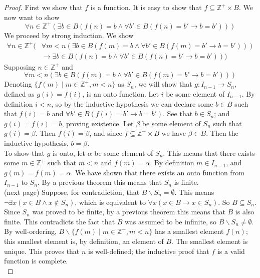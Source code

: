 \documentclass{report}
\theoremstyle{definition}
\begin{document}
\begin{proof}
First we show that $f$ is a function. It is easy to show that $f\subseteq\mathbb Z^+\times B$.
We now want to show
\begin{equation*}
\forall n\in\mathbb Z^+(\exists b\in B(f(n)=b\land\forall b'\in B(f(n)=b'\to b=b')))
\end{equation*}
We proceed by strong induction. We show
\begin{align*}
\forall n\in\mathbb Z^+(&\forall m<n(\exists b\in B(f(m)=b\land\forall b'\in B(f(m)=b'\to b=b')))\\
&\to\exists b\in B(f(n)=b\land\forall b'\in B(f(n)=b'\to b=b')))
\end{align*}
Supposing $n\in\mathbb Z^+$ and
\begin{equation*}
\forall m<n(\exists b\in B(f(m)=b\land\forall b'\in B(f(m)=b'\to b=b')))
\end{equation*}
Denoting $\{f(m)\mid m\in\mathbb Z^+,m<n\}$ as $S_n$,
we will show that $g:I_{n-1}\to S_n$, defined as $g(i)=f(i)$, is an onto function. Let $i$ be some element of $I_{n-1}$. 
By definition $i<n$, so by the inductive hypothesis we can declare some $b\in B$ such that $f(i)=b$ and $\forall b'\in B(f(i)=b'\to b=b')$. 
See that $b\in S_n$; and $g(i)=f(i)=b$, proving existence. Let $\beta$ be some element of $S_n$ such that $g(i)=\beta$. Then $f(i)=\beta$, and since $f\subseteq\mathbb Z^+\times B$ we have
$\beta\in B$. Then the inductive hypothesis, $b=\beta$.\\
\indent To show that $g$ is onto, let $\alpha$ be some element of $S_n$. This means that there exists some $m\in\mathbb Z^+$ such that $m<n$ and $f(m)=\alpha$. By definition $m\in I_{n-1}$, and 
$g(m)=f(m)=\alpha$. We have shown that there exists an onto function from $I_{n-1}$ to $S_n$. By a previous theorem this means that $S_n$ is finite.\\
(next page)\newpage
\indent Suppose, for contradiction, that $B\backslash S_n=\emptyset$.
This means $\neg\exists x(x\in B\land x\notin S_n)$, which is equivalent to $\forall x(x\in B\to x\in S_n)$. So $B\subseteq S_n$. Since $S_n$ was proved to be finite, by a previous theorem this
means that $B$ is also finite. This contradicts the fact that $B$ was assumed to be infinite, so 
$B\backslash S_n\neq\emptyset$.\\
\indent By well-ordering, $B\backslash\{f(m)\mid m\in\mathbb Z^+,m<n\}$ has a smallest element $f(n)$;
this smallest element is, by definition, an element of $B$. The smallest element is unique. This proves that $n$ is well-defined; the inductive proof that $f$ is a valid function is complete.\\

\end{proof}
\end{document}
